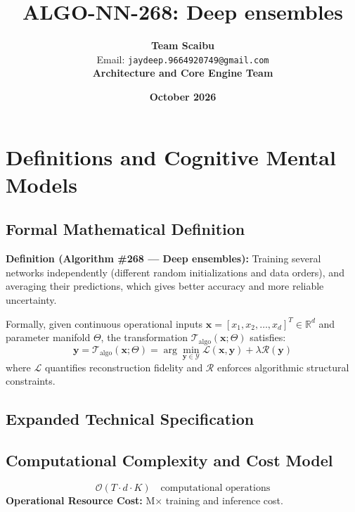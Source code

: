 \documentclass[11pt,a4paper]{article}
\title{\textbf{ALGO-NN-268: Deep ensembles}}
\author{\textbf{Team Scaibu} \\ \small Email: \texttt{jaydeep.9664920749@gmail.com} \\ \small \textbf{Architecture and Core Engine Team}}
\date{\textbf{October 2026}}
\theoremstyle{definition}
\begin{document}
\maketitle

\section{Definitions and Cognitive Mental Models}

\subsection{Formal Mathematical Definition}
\textbf{Definition (Algorithm \#268 --- Deep ensembles):}
Training several networks independently (different random initializations and data orders), and averaging their predictions, which gives better accuracy and more reliable uncertainty.

Formally, given continuous operational inputs $\mathbf{x} = [x_1, x_2, \dots, x_d]^T \in \mathbb{R}^d$ and parameter manifold $\Theta$, the transformation $\mathcal{T}_{\text{algo}}(\mathbf{x}; \Theta)$ satisfies:
{\boldmath
\begin{equation}
\mathbf{y} = \mathcal{T}_{\text{algo}}(\mathbf{x}; \Theta) = \arg\min_{\mathbf{y} \in \mathcal{Y}} \mathcal{L}(\mathbf{x}, \mathbf{y}) + \lambda \mathcal{R}(\mathbf{y})
\end{equation}
}
where $\mathcal{L}$ quantifies reconstruction fidelity and $\mathcal{R}$ enforces algorithmic structural constraints.

\subsection{Expanded Technical Specification}

\subsection{Computational Complexity and Cost Model}
\begin{equation}
\mathcal{O}(T \cdot d \cdot K) \quad \text{computational operations}
\end{equation}
\textbf{Operational Resource Cost:} M× training and inference cost.
\end{document}
